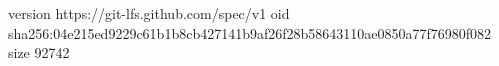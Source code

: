 version https://git-lfs.github.com/spec/v1
oid sha256:04e215ed9229c61b1b8cb427141b9af26f28b58643110ae0850a77f76980f082
size 92742
